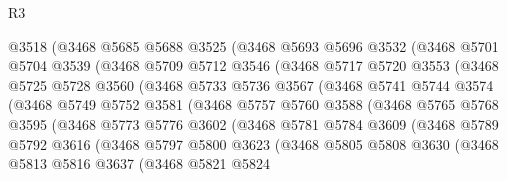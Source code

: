\begin{lexlean}{R3}
\begin{coremodule}
            @3518
            (@3468
              @5685
              @5688
              @3525
              (@3468
                @5693
                @5696
                @3532
                (@3468
                  @5701
                  @5704
                  @3539
                  (@3468
                    @5709
                    @5712
                    @3546
                    (@3468
                      @5717
                      @5720
                      @3553
                      (@3468
                        @5725
                        @5728
                        @3560
                        (@3468
                          @5733
                          @5736
                          @3567
                          (@3468
                            @5741
                            @5744
                            @3574
                            (@3468
                              @5749
                              @5752
                              @3581
                              (@3468
                                @5757
                                @5760
                                @3588
                                (@3468
                                  @5765
                                  @5768
                                  @3595
                                  (@3468
                                    @5773
                                    @5776
                                    @3602
                                    (@3468
                                      @5781
                                      @5784
                                      @3609
                                      (@3468
                                        @5789
                                        @5792
                                        @3616
                                        (@3468
                                          @5797
                                          @5800
                                          @3623
                                          (@3468
                                            @5805
                                            @5808
                                            @3630
                                            (@3468
                                              @5813
                                              @5816
                                              @3637
                                              (@3468
                                                @5821
                                                @5824

\end{coremodule}
\end{lexlean}
